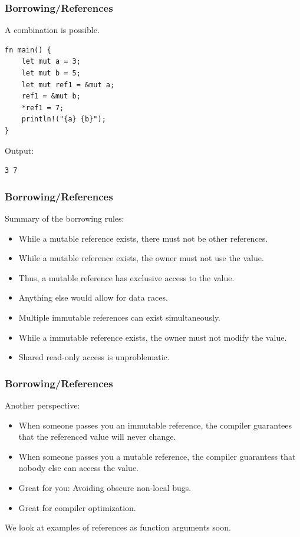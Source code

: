 \begin{frame}[fragile]
    \frametitle{Borrowing/References}
    A combination is possible.
    \pause
    \vfill
    \begin{verbatim}
fn main() {
    let mut a = 3;
    let mut b = 5;
    let mut ref1 = &mut a;
    ref1 = &mut b;
    *ref1 = 7;
    println!("{a} {b}");
}
    \end{verbatim}
    \vfill
    Output:
    \pause
    \vfill
    \begin{verbatim}
3 7
    \end{verbatim}
\end{frame}


\begin{frame}[fragile]
    \frametitle{Borrowing/References}
    Summary of the borrowing rules:
    \vfill
    \begin{itemize}
        \item While a mutable reference exists, there must not be other references.
        \item While a mutable reference exists, the owner must not use the value.
        \pause
        \item Thus, a mutable reference has exclusive access to the value.
        \pause
        \item Anything else would allow for data races.
        \pause
        \vspace{.3cm}
        \item Multiple immutable references can exist simultaneously.
        \item While a immutable reference exists, the owner must not modify the value.
        \pause
        \item Shared read-only access is unproblematic.
    \end{itemize}
\end{frame}

\begin{frame}[fragile]
    \frametitle{Borrowing/References}
    Another perspective:
    \vfill
    \begin{itemize}
        \item When someone passes you an immutable reference, the compiler guarantees that the referenced value will never change. 
        \pause
        \item When someone passes you a mutable reference, the compiler guarantess that nobody else can access the value.
        \vspace{.3cm}
        \pause
        \item Great for you: Avoiding obscure non-local bugs.
        \item Great for compiler optimization.
    \end{itemize}
    \pause
    \vfill
    We look at examples of references as function arguments soon.
\end{frame}

